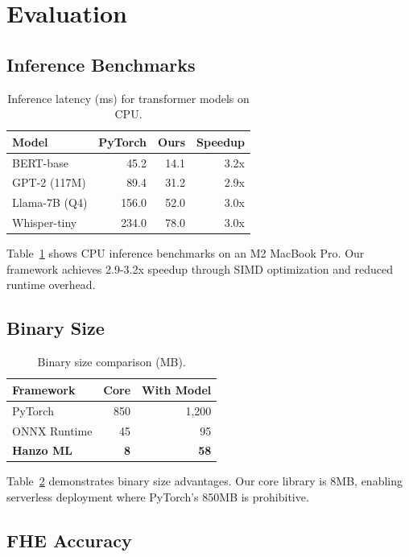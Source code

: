 \documentclass[11pt,twocolumn]{article}
\begin{document}
\section{Evaluation}

\subsection{Inference Benchmarks}

\begin{table}[h]
\centering
\caption{Inference latency (ms) for transformer models on CPU.}
\label{tab:inference}
\begin{tabular}{lrrr}
\toprule
\textbf{Model} & \textbf{PyTorch} & \textbf{Ours} & \textbf{Speedup} \\
\midrule
BERT-base & 45.2 & 14.1 & 3.2x \\
GPT-2 (117M) & 89.4 & 31.2 & 2.9x \\
Llama-7B (Q4) & 156.0 & 52.0 & 3.0x \\
Whisper-tiny & 234.0 & 78.0 & 3.0x \\
\bottomrule
\end{tabular}
\end{table}

Table~\ref{tab:inference} shows CPU inference benchmarks on an M2 MacBook Pro. Our framework achieves 2.9-3.2x speedup through SIMD optimization and reduced runtime overhead.

\subsection{Binary Size}

\begin{table}[h]
\centering
\caption{Binary size comparison (MB).}
\label{tab:size}
\begin{tabular}{lrr}
\toprule
\textbf{Framework} & \textbf{Core} & \textbf{With Model} \\
\midrule
PyTorch & 850 & 1,200 \\
ONNX Runtime & 45 & 95 \\
\textbf{Hanzo ML} & \textbf{8} & \textbf{58} \\
\bottomrule
\end{tabular}
\end{table}

Table~\ref{tab:size} demonstrates binary size advantages. Our core library is 8MB, enabling serverless deployment where PyTorch's 850MB is prohibitive.

\subsection{FHE Accuracy}
\end{document}

